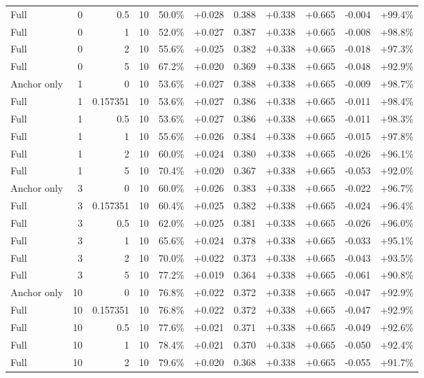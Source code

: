 \begin{table}[htbp]
\begin{tabular}{lrrrccccccc}
Full & 0 & 0.5 & 10 & 50.0\% & +0.028 & 0.388 & +0.338 & +0.665 & -0.004 & +99.4\% \\
Full & 0 & 1 & 10 & 52.0\% & +0.027 & 0.387 & +0.338 & +0.665 & -0.008 & +98.8\% \\
Full & 0 & 2 & 10 & 55.6\% & +0.025 & 0.382 & +0.338 & +0.665 & -0.018 & +97.3\% \\
Full & 0 & 5 & 10 & 67.2\% & +0.020 & 0.369 & +0.338 & +0.665 & -0.048 & +92.9\% \\
Anchor only & 1 & 0 & 10 & 53.6\% & +0.027 & 0.388 & +0.338 & +0.665 & -0.009 & +98.7\% \\
Full & 1 & 0.157351 & 10 & 53.6\% & +0.027 & 0.386 & +0.338 & +0.665 & -0.011 & +98.4\% \\
Full & 1 & 0.5 & 10 & 53.6\% & +0.027 & 0.386 & +0.338 & +0.665 & -0.011 & +98.3\% \\
Full & 1 & 1 & 10 & 55.6\% & +0.026 & 0.384 & +0.338 & +0.665 & -0.015 & +97.8\% \\
Full & 1 & 2 & 10 & 60.0\% & +0.024 & 0.380 & +0.338 & +0.665 & -0.026 & +96.1\% \\
Full & 1 & 5 & 10 & 70.4\% & +0.020 & 0.367 & +0.338 & +0.665 & -0.053 & +92.0\% \\
Anchor only & 3 & 0 & 10 & 60.0\% & +0.026 & 0.383 & +0.338 & +0.665 & -0.022 & +96.7\% \\
Full & 3 & 0.157351 & 10 & 60.4\% & +0.025 & 0.382 & +0.338 & +0.665 & -0.024 & +96.4\% \\
Full & 3 & 0.5 & 10 & 62.0\% & +0.025 & 0.381 & +0.338 & +0.665 & -0.026 & +96.0\% \\
Full & 3 & 1 & 10 & 65.6\% & +0.024 & 0.378 & +0.338 & +0.665 & -0.033 & +95.1\% \\
Full & 3 & 2 & 10 & 70.0\% & +0.022 & 0.373 & +0.338 & +0.665 & -0.043 & +93.5\% \\
Full & 3 & 5 & 10 & 77.2\% & +0.019 & 0.364 & +0.338 & +0.665 & -0.061 & +90.8\% \\
Anchor only & 10 & 0 & 10 & 76.8\% & +0.022 & 0.372 & +0.338 & +0.665 & -0.047 & +92.9\% \\
Full & 10 & 0.157351 & 10 & 76.8\% & +0.022 & 0.372 & +0.338 & +0.665 & -0.047 & +92.9\% \\
Full & 10 & 0.5 & 10 & 77.6\% & +0.021 & 0.371 & +0.338 & +0.665 & -0.049 & +92.6\% \\
Full & 10 & 1 & 10 & 78.4\% & +0.021 & 0.370 & +0.338 & +0.665 & -0.050 & +92.4\% \\
Full & 10 & 2 & 10 & 79.6\% & +0.020 & 0.368 & +0.338 & +0.665 & -0.055 & +91.7\% \\

\end{tabular}
\end{table}

